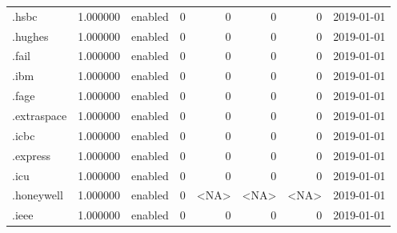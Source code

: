 \begin{tabular}{lrlrrrrl}
.hsbc                     &          1.000000 &         enabled &                           0 &                           0 &                           0 &                   0 &           2019-01-01 \\
.hughes                   &          1.000000 &         enabled &                           0 &                           0 &                           0 &                   0 &           2019-01-01 \\
.fail                     &          1.000000 &         enabled &                           0 &                           0 &                           0 &                   0 &           2019-01-01 \\
.ibm                      &          1.000000 &         enabled &                           0 &                           0 &                           0 &                   0 &           2019-01-01 \\
.fage                     &          1.000000 &         enabled &                           0 &                           0 &                           0 &                   0 &           2019-01-01 \\
.extraspace               &          1.000000 &         enabled &                           0 &                           0 &                           0 &                   0 &           2019-01-01 \\
.icbc                     &          1.000000 &         enabled &                           0 &                           0 &                           0 &                   0 &           2019-01-01 \\
.express                  &          1.000000 &         enabled &                           0 &                           0 &                           0 &                   0 &           2019-01-01 \\
.icu                      &          1.000000 &         enabled &                           0 &                           0 &                           0 &                   0 &           2019-01-01 \\
.honeywell                &          1.000000 &         enabled &                           0 &                        <NA> &                        <NA> &                <NA> &           2019-01-01 \\
.ieee                     &          1.000000 &         enabled &                           0 &                           0 &                           0 &                   0 &           2019-01-01 \\

\end{tabular}
